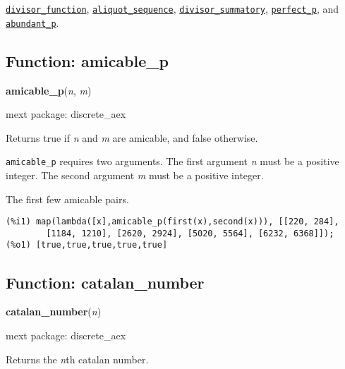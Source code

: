 \documentclass[]{article}
\begin{document}
\vspace{5 pt}


  \hyperlink{divisor_function}{{\tt divisor\_function}}, \hyperlink{aliquot_sequence}{{\tt aliquot\_sequence}}, \hyperlink{divisor_summatory}{{\tt divisor\_summatory}}, \hyperlink{perfect_p}{{\tt perfect\_p}}, and \hyperlink{abundant_p}{{\tt abundant\_p}}.

\vspace{5 pt}


\subsection{Function: amicable\_p\label{sec:amicable_p}}
\hypertarget{amicable_p}{}
{\bf amicable\_p}({\it n}, {\it m})


\noindent mext package: discrete\_aex



\vspace{5 pt}
Returns true if {\it n} and {\it m} are amicable, and false otherwise. 

\vspace{5 pt}

   {\tt amicable\_p} requires two arguments.
    The first argument {\it n} must be a positive integer.
    The second argument {\it m} must be a positive integer.


\vspace{5 pt}


   The first few amicable pairs. 

\begin{Verbatim}[frame=single]
(%i1) map(lambda([x],amicable_p(first(x),second(x))), [[220, 284], 
        [1184, 1210], [2620, 2924], [5020, 5564], [6232, 6368]]);
(%o1) [true,true,true,true,true]
\end{Verbatim}


\subsection{Function: catalan\_number\label{sec:catalan_number}}
\hypertarget{catalan_number}{}
{\bf catalan\_number}({\it n})


\noindent mext package: discrete\_aex



\vspace{5 pt}
Returns the {\it n}th catalan number. 
\end{document}
